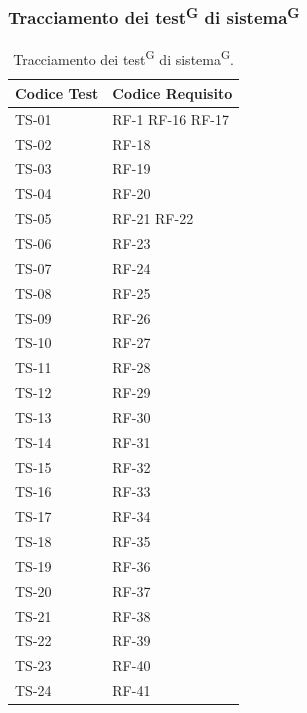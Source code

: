 \documentclass[8pt]{article}
\newcommand{\glossterm}[1]{#1\textsuperscript{G}} %
\begin{document}
\subsubsection{Tracciamento dei \glossterm{test} di \glossterm{sistema}}\label{sec:tracciamento test sistema}
\renewcommand{\arraystretch}{2.5}
\begin{longtable}{|>{\centering}p{4cm}|>{\centering\arraybackslash}p{4cm}|}
\hline
\rowcolor{white}
\textbf{Codice Test} & \textbf{Codice Requisito} \\
\hline
\endfirsthead
\rowcolor{white}
\caption{Tracciamento dei \glossterm{test} di \glossterm{sistema}.}
\label{table:Tracciamento dei test di sistema}
\endlastfoot
    TS-01 & RF-1  \newline
            RF-16 \newline
            RF-17 \\
    \hline 
    TS-02 & RF-18 \\
    \hline 
    TS-03 & RF-19 \\
    \hline 
    TS-04 & RF-20 \\
    \hline
    TS-05 & RF-21 \newline
            RF-22 \\
    \hline
    TS-06 & RF-23 \\
    \hline
    TS-07 & RF-24 \\
    \hline
    TS-08 & RF-25 \\
    \hline
    TS-09 & RF-26 \\
    \hline
    TS-10 & RF-27 \\
    \hline
    TS-11 & RF-28 \\
    \hline
    TS-12 & RF-29 \\
    \hline
    TS-13 & RF-30 \\
    \hline
    TS-14 & RF-31 \\
    \hline
    TS-15 & RF-32 \\
    \hline
    TS-16 & RF-33 \\
    \hline
    TS-17 & RF-34 \\
    \hline
    TS-18 & RF-35 \\
    \hline
    TS-19 & RF-36 \\
    \hline
    TS-20 & RF-37 \\
    \hline
    TS-21 & RF-38 \\
    \hline
    TS-22 & RF-39 \\
    \hline
    TS-23 & RF-40 \\
    \hline
    TS-24 & RF-41 \\

\end{longtable}
\end{document}
